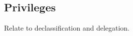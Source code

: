 \subsection{Privileges}
\label{sec:system:privileges}
Relate to declassification and delegation.






